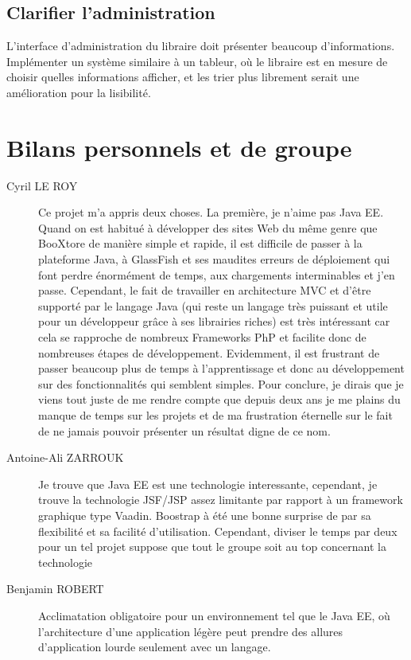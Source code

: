 	\subsection{Clarifier l'administration}

	L'interface d'administration du libraire doit présenter beaucoup d'informations. Implémenter un système similaire à un tableur, où le libraire est en mesure de choisir quelles informations afficher, et les trier plus librement serait une amélioration pour la lisibilité.


\section{Bilans personnels et de groupe}

\begin{description}
	\item[Cyril LE ROY]
	Ce projet m’a appris deux choses.
	La première, je n’aime pas Java EE. Quand on est habitué à développer des sites Web du même genre que BooXtore de manière simple et rapide, il est difficile de passer à la plateforme Java, à GlassFish et ses maudites erreurs de déploiement qui font perdre énormément de temps, aux chargements interminables et j’en passe.
	Cependant, le fait de travailler en architecture MVC et d’être supporté par le langage Java (qui reste un langage très puissant et utile pour un développeur grâce à ses librairies riches) est très intéressant car cela se rapproche de nombreux Frameworks PhP et facilite donc de nombreuses étapes de développement.
	Evidemment, il est frustrant de passer beaucoup plus de temps à l’apprentissage et donc au développement sur des fonctionnalités qui semblent simples.
	Pour conclure, je dirais que je viens tout juste de me rendre compte que depuis deux ans je me plains du manque de temps sur les projets et de ma frustration éternelle sur le fait de ne jamais pouvoir présenter un résultat digne de ce nom.
	\item[Antoine-Ali ZARROUK]
	Je trouve que Java EE est une technologie interessante, cependant, je trouve la technologie JSF/JSP assez limitante par rapport à un framework graphique type Vaadin.
	Boostrap à été une bonne surprise de par sa flexibilité et sa facilité d'utilisation.
	Cependant, diviser le temps par deux pour un tel projet suppose que tout le groupe soit au top concernant la technologie
	\item[Benjamin ROBERT]
	Acclimatation obligatoire pour un environnement tel que le Java EE, où l'architecture d'une application légère peut prendre des allures d'application lourde seulement avec un langage.

\end{description}
